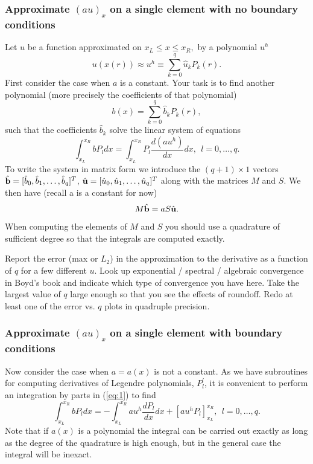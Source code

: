 \documentclass[12pt]{article}
\newcommand{\be}{\begin{equation}}
\newcommand{\ee}{\end{equation}}
\begin{document}
\subsubsection*{Approximate $(au)_x$ on a single element with no boundary conditions}
Let $u$ be a function approximated on $x_L \le x \le x_R,$ by a polynomial $u^h$
\be
u(x(r)) \approx u^h \equiv \sum_{k=0}^{q} \hat{u}_k P_k(r).
\ee
First consider the case when $a$ is a constant. Your task is to find another polynomial (more precisely the coefficients of that polynomial) 
\[
b(x) = \sum_{k=0}^{q} \hat{b}_k P_k(r),
\]
such that the coefficients $\hat{b}_k$ solve the linear system of equations 
\be 
\int_{x_L}^{x_R} b P_l  dx = \int_{x_L}^{x_R} P_l \frac{d (au^h)}{dx} dx, \ \ l = 0,\ldots,q. \label{eq:1}
\ee
To write the system in matrix form we introduce the $(q+1) \times 1$ vectors $\hat{{\bf b}} = [\hat{b}_0, \hat{b}_1, \ldots,\hat{b}_q]^T$, $\hat{{\bf u}} = [\hat{u}_0, \hat{u}_1, \ldots,\hat{u}_q]^T$ along with the matrices $M$ and $S$. We then have (recall a is a constant for now)
\[
M \hat{{\bf b}} = a S \hat{{\bf u}}.
\]

When computing the elements of $M$ and $S$ you should use a quadrature of sufficient degree so that the integrals are computed exactly.

Report the error (max or $L_2$) in the approximation to the derivative as a function of $q$ for a few different $u$. Look up exponential / spectral / algebraic convergence in Boyd's book and indicate which type of convergence you have here. Take the largest value of $q$ large enough so that you see the effects of roundoff. Redo at least one of the error vs. $q$ plots in quadruple precision.    

\subsubsection*{Approximate $(au)_x$ on a single element with boundary conditions}
Now consider the case when $a = a(x)$ is not a constant. As we have subroutines for computing derivatives of Legendre polynomials, $P^\prime_l$, it is convenient to perform an integration by parts in (\ref{eq:1}) to find
\be
\int_{x_L}^{x_R} b P_l  dx = - \int_{x_L}^{x_R} au^h \frac{d P_l}{dx}  dx +  \left[au^h P_l  \right]_{x_L}^{x_R}, \ \ l = 0,\ldots,q. \label{eq:2}
\ee
Note that if $a(x)$ is a polynomial the integral can be carried out exactly as long as the degree of the quadrature is high enough, but in the general case the integral will be inexact. 
\end{document}
